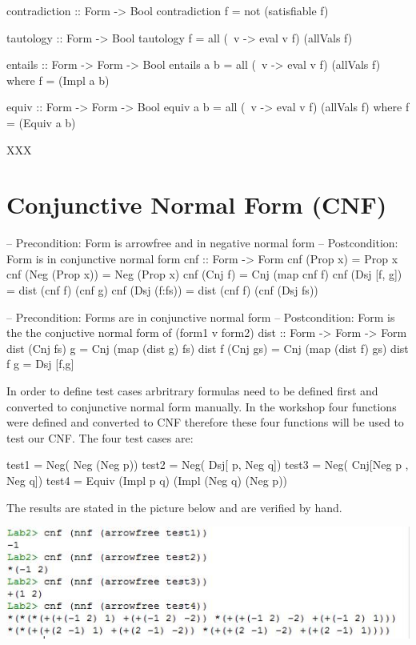 \documentclass{article}
\begin{document}
\begin{code}
contradiction :: Form -> Bool
contradiction f = not (satisfiable f)

tautology :: Form -> Bool
tautology f = all (\ v -> eval v f) (allVals f)

entails :: Form -> Form -> Bool
entails a b = all (\ v -> eval v f) (allVals f) where f = (Impl a b)

equiv :: Form -> Form -> Bool
equiv a b = all (\ v -> eval v f) (allVals f) where f = (Equiv a b)

\end{code}

XXX

\section*{Conjunctive Normal Form (CNF)}

\begin{code}
-- Precondition: Form is arrowfree and in negative normal form
-- Postcondition: Form is in conjunctive normal form
cnf :: Form -> Form
cnf (Prop x)		= Prop x
cnf (Neg (Prop x))	= Neg (Prop x)
cnf (Cnj f)		= Cnj (map cnf f)
cnf (Dsj [f, g])	= dist (cnf f) (cnf g)
cnf (Dsj (f:fs))	= dist (cnf f) (cnf (Dsj fs))

-- Precondition: Forms are in conjunctive normal form
-- Postcondition: Form is the the conjuctive normal form of (form1 v form2)
dist :: Form -> Form -> Form
dist (Cnj fs) g 	= Cnj (map (dist g) fs)
dist f (Cnj gs)		= Cnj (map (dist f) gs)
dist f g 		= Dsj [f,g]

\end{code}

In order to define test cases arbritrary formulas need to be defined first and converted to conjunctive normal form manually. In the workshop four functions were defined and converted to CNF therefore these four functions will be used to test our CNF. 
The four test cases are:

\begin{code}
test1 = Neg( Neg (Neg p))
test2 = Neg( Dsj[ p, Neg q])
test3 = Neg( Cnj[Neg p , Neg q])
test4 = Equiv (Impl p q) (Impl (Neg q) (Neg p))
\end{code}

The results are stated in the picture below and are verified by hand.

\includegraphics{Knipsel2}
\end{document}
